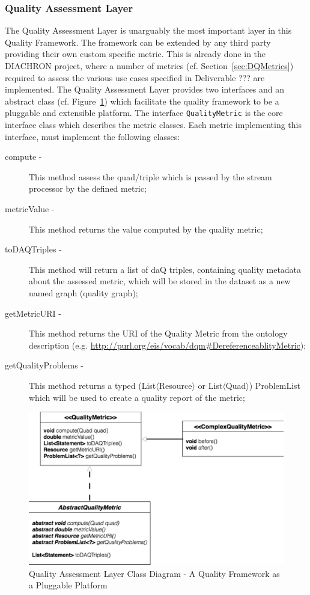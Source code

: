 \subsubsection{Quality Assessment Layer}
The Quality Assessment Layer is unarguably the most important layer in this Quality Framework.
The framework can be extended by any third party providing their own custom specific metric.
This is already done in the DIACHRON project, where a number of metrics (cf. Section~\ref{sec:DQMetrics}) required to assess the various use cases specified in Deliverable ??? are implemented.
The Quality Assessment Layer provides two interfaces and an abstract class (cf. Figure~\ref{fig:classDiagram}) which facilitate the quality framework to be a pluggable and extensible platform.
The interface \texttt{QualityMetric} is the core interface class which describes the metric classes.
Each metric implementing this interface, must implement the following classes:
\begin{description}
\item[compute - ] This method assess the quad/triple which is passed by the stream processor by the defined metric;
\item[metricValue - ] This method returns the value computed by the quality metric;
\item[toDAQTriples - ] This method will return a list of daQ triples, containing quality metadata about the assessed metric, which will be stored in the dataset as a new named graph (quality graph);
\item[getMetricURI - ] This method returns the URI of the Quality Metric from the ontology description (e.g. \url{http://purl.org/eis/vocab/dqm#DereferenceablityMetric});
\item[getQualityProblems - ] This method returns a typed (List$\langle$Resource$\rangle$ or List$\langle$Quad$\rangle$) ProblemList which will be used to create a quality report of the metric;
\end{description}

\begin{figure}[tbph]
\center
\includegraphics[scale=0.3]{images/classdiagram.pdf} 
\caption{Quality Assessment Layer Class Diagram - A Quality Framework as a Pluggable Platform} 
\label{fig:classDiagram}
\end{figure}

